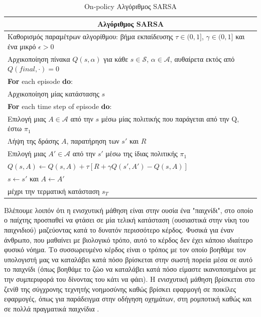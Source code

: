 \documentclass[11pt]{article} %
\numberwithin{equation}{subsection}
\begin{document}
\begin{table}[H]
\begin{tabular}{ |p{13cm}}
 \hline
 \multicolumn{1}{|c|}{\textbf{Αλγόριθμος SARSA}} \\
 \hline
 Καθορισμός παραμέτρων αλγορίθμου: βήμα εκπαίδευσης $\tau \in (0,1]$, $\gamma \in (0,1]$ και ένα μικρό $\epsilon > 0$ \\
 Αρχικοποίηση πίνακα $Q(s,\alpha)$ για κάθε $s \in \mathcal{S}$, $\alpha \in \mathcal{A}$, αυθαίρετα εκτός από $Q(final, \cdot) = 0$  \\
 \textbf{For} each episode \textbf{do}:\\
Αρχικοποίηση μίας κατάστασης $s$ \\
\textbf{For} each time step of episode \textbf{do}:  \\
Επιλογή μιας $A \in \mathcal{A}$ από την $s$ μέσω μίας πολιτικής που παράγεται από την Q, έστω $\pi_{1}$\\
Λήψη της δράσης $A$, παρατήρηση των $s'$ και $R$\\
Επιλογή μιας $Α' \in \mathcal{A}$ από την $s'$ μέσω της ίδιας πολιτικής $\pi_{1}$\\
$Q(s, A) \leftarrow Q(s, A) + \tau[R + \gamma Q(s', A') - Q(s, A)]$\\
$s \leftarrow s'$ και $Α \leftarrow A'$\\
μέχρι την τερματική κατάσταση $s_{T}$\\
\hline
\end{tabular}
\caption{On-policy Αλγόριθμος SARSA}
\end{table}

Βλέπουμε λοιπόν ότι η ενισχυτική μάθηση είναι στην ουσία ένα "παιχνίδι", στο οποίο ο παίχτης προσπαθεί να φτάσει σε μία τελική κατάσταση (ουσιαστικά στην νίκη του παιχνιδιού) μαζεύοντας κατά το δυνατόν περισσότερο κέρδος. Φυσικά για έναν άνθρωπο, που μαθαίνει με βιολογικό τρόπο, αυτό το κέρδος δεν έχει κάποιο ιδιαίτερο φυσικό νόημα. Το συσσωρευμένο κέρδος είναι ο τρόπος με τον οποίο βοηθάμε τον υπολογιστή μας να καταλάβει κατά πόσο βρίσκεται στην σωστή πορεία μέσα σε αυτό το παιχνίδι (όπως βοηθάμε το ζώο να καταλάβει κατά πόσο είμαστε ικανοποιημένοι με την συμπεριφορά του δίνοντας του κάτι να φάει). Η ενισχυτική μάθηση βρίσκεται στο ζενίθ της σύγχρονης τεχνητής νοημοσύνης καθώς βρίσκει εφαρμογή σε ποικίλες εφαρμογές, όπως για παράδειγμα στην οδήγηση οχημάτων, στη ρομποτική καθώς και σε πολλά πραγματικά παιχνίδια \cite{atari}.  \\

\newpage
\end{document}
